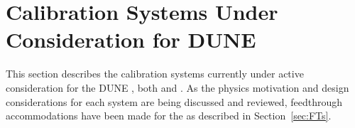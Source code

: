 \section{Calibration Systems Under Consideration for DUNE}\label{sec:extsystems}
This section describes the calibration systems currently %
under active consideration for the DUNE , both \single and \dual. As the physics motivation and design considerations for each system are being discussed and reviewed, feedthrough accommodations have been made for the \spmod %
as described in Section~\ref{sec:FTs}. 


\cleardoublepage


\cleardoublepage


\cleardoublepage


\cleardoublepage



\cleardoublepage


\cleardoublepage

